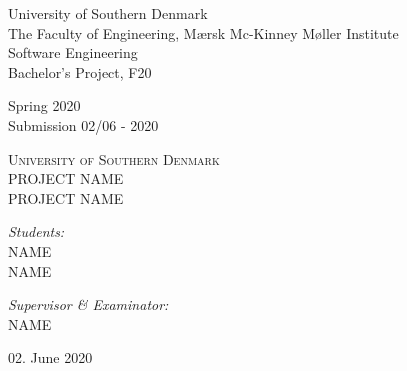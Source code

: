 \documentclass[../main.tex]{subfiles}
\begin{document}
\begin{titlepage}
\begin{center}

\noindent
\begin{minipage}{0.6\textwidth}
\begin{flushleft} 
\footnotesize
University of Southern Denmark\\
The Faculty of Engineering, Mærsk Mc-Kinney Møller Institute \\
Software Engineering\\
Bachelor's Project, F20 \\
\end{flushleft}
\end{minipage}%
\begin{minipage}{0.4\textwidth}
\begin{flushright} 
\small
Spring 2020\\
Submission 02/06 - 2020
\end{flushright}
\end{minipage}

\vspace*{50px}

\textsc{\LARGE University of Southern Denmark}\\[0.5cm]

\textsc{\Large PROJECT NAME}\\[0.5cm]
\textsc{\Large PROJECT NAME}\\[0.5cm]


\vspace*{250px}


\noindent
\begin{minipage}{0.6\textwidth}
\begin{flushleft} 
\small
\emph{Students:}\\
    NAME\\
    NAME\\
\end{flushleft}
\end{minipage}%
\begin{minipage}{0.4\textwidth}
\begin{flushright} 
\small
\emph{Supervisor \& Examinator:} \\
NAME\\
\end{flushright}
\end{minipage}

\vfill

{\large 02. June 2020}
\end{center}
\end{titlepage}
\end{document}
